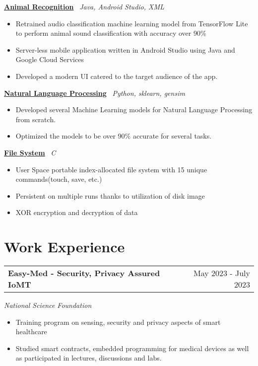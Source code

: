\documentclass[a4paper,12pt]{article}
\begin{document}
\href{https://github.com/kilibarda4/animal-recognition-android}{\textbf{Animal Recognition}} \ \textit{Java, Android Studio, XML}
\begin{itemize}[leftmargin=*, nosep]
    \item Retrained audio classification machine learning model from TensorFlow Lite to perform animal sound classification with accuracy over 90\%
    \item Server-less mobile application written in Android Studio using Java and Google Cloud Services
    \item Developed a modern UI catered to the target audience of the app.
\end{itemize}
\href{https://github.com/kilibarda4/natural-language-processing}{\textbf{Natural Language Processing}} \ \textit{Python, sklearn, gensim}
\begin{itemize}[leftmargin=*, nosep]
    \item Developed several Machine Learning models for Natural Language Processing from scratch.
    \item Optimized the models to be over 90\% accurate for several tasks.
\end{itemize}
\href{https://github.com/kilibarda4/file-system}{\textbf{File System}} \ \textit{C}
\begin{itemize}[leftmargin=*, nosep]
    \item User Space portable index-allocated file system with 15 unique commands(touch, save, etc.)
    \item Persistent on multiple runs thanks to utilization of disk image
    \item XOR encryption and decryption of data
\end{itemize}
\section{Work Experience}

\begin{tabularx}{\linewidth}{@{}Xr@{}}
\textbf{Easy-Med - Security, Privacy Assured IoMT} & \hfill May 2023 - July 2023
\end{tabularx}
\textit{National Science Foundation}
\begin{itemize}[leftmargin=*, nosep]
    \item Training program on sensing, security and privacy aspects of smart healthcare
    \item Studied smart contracts, embedded programming for medical devices as well as participated in lectures, discussions and labs.
\end{itemize}
\end{document}
